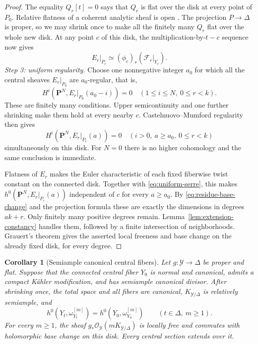 \documentclass[11pt,a4paper]{article}
\numberwithin{equation}{section}
\newtheorem{corollary}[theorem]{Corollary}
\theoremstyle{definition}
\theoremstyle{remark}
\newcommand{\PP}{\mathbf P}\newcommand{\HH}{\mathbb H}
\newcommand{\OO}{\mathcal O}\newcommand{\cX}{\mathcal X}
\begin{document}
\begin{proof}
The equality $Q_r[t]=0$ says that $Q_r$ is flat over the disk at
every point of $P_0$. Relative flatness of a coherent analytic
sheaf is open \cite{Frisch1967}. The projection $P\to\Delta$ is proper, so we may
shrink once to make all the finitely many $Q_r$ flat over the whole
new disk. At any point $c$ of this disk, the multiplication-by-$t-c$
sequence now gives
\begin{equation}\label{eq:residue-base-change}
 E_r|_{P_c}\simeq(\phi_c)_*(\mathcal F_r|_{Y_c}).
\end{equation}
\smallskip\noindent\emph{Step 3: uniform regularity.}
Choose one nonnegative integer $a_0$ for which all the central
sheaves $E_r|_{P_0}$ are $a_0$-regular, that is,
\[
 H^i(\PP^N,E_r|_{P_0}(a_0-i))=0
 \quad(1\le i\le N,\ 0\le r<k).
\]
These are finitely many conditions. Upper semicontinuity and one
further shrinking make them hold at every nearby $c$.
Castelnuovo--Mumford regularity \cite[Lecture~14]{Mumford1966} then gives
\begin{equation}\label{eq:uniform-serre}
 H^i(\PP^N,E_r|_{P_c}(a))=0
 \quad(i>0,\ a\ge a_0,\ 0\le r<k)
\end{equation}
simultaneously on this disk. For $N=0$ there is no higher
cohomology and the same conclusion is immediate.

Flatness of $E_r$ makes the Euler characteristic of each fixed
fiberwise twist constant on the connected disk. Together
with \eqref{eq:uniform-serre}, this makes
$h^0(\PP^N,E_r|_{P_c}(a))$ independent of $c$ for every $a\ge a_0$.
By \eqref{eq:residue-base-change} and the projection formula these
are exactly the dimensions in degrees $ak+r$. Only finitely many
positive degrees remain. Lemma~\ref{lem:extension-constancy} handles
them, followed by a finite intersection of neighborhoods.
Grauert's theorem gives the asserted local freeness and base change
on the already fixed disk, for every degree.
\end{proof}

\begin{corollary}[Semiample canonical central fibers]
\label{cor:uniform-endpoint}
Let $g:\mathcal Y\to\Delta$ be proper and flat. Suppose that the
connected central fiber $Y_0$ is normal and canonical, admits a
compact Kähler modification, and has semiample canonical divisor.
After shrinking once, the total space and all fibers are canonical,
$K_{\mathcal Y/\Delta}$ is relatively semiample, and
\[
 h^0(Y_t,\omega_{Y_t}^{[m]})=h^0(Y_0,\omega_{Y_0}^{[m]})
 \qquad(t\in\Delta,\ m\ge1).
\]
For every $m\ge1$, the sheaf
$g_*\OO_{\mathcal Y}(mK_{\mathcal Y/\Delta})$ is locally free and
commutes with holomorphic base change on this disk. Every central
section extends over it.
\end{corollary}
\end{document}
